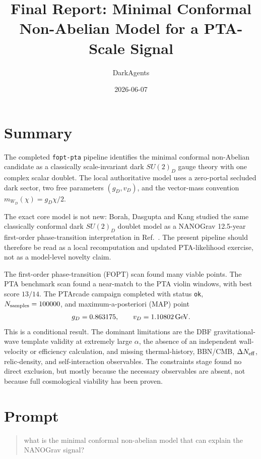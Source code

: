 \documentclass[11pt]{article}
\title{Final Report: Minimal Conformal Non-Abelian Model for a PTA-Scale Signal}
\author{DarkAgents}
\date{2026-06-07}
\newcommand{\SUtwoD}{\ensuremath{SU(2)_D}}
\newcommand{\gev}{\,{\rm GeV}}
\begin{document}
\maketitle

\section{Summary}
The completed \texttt{fopt-pta} pipeline identifies the minimal conformal non-Abelian candidate as a classically scale-invariant dark \SUtwoD{} gauge theory with one complex scalar doublet. The local authoritative model uses a zero-portal secluded dark sector, two free parameters $(g_D,v_D)$, and the vector-mass convention $m_{W_D}(\chi)=g_D\chi/2$.

The exact core model is not new: Borah, Dasgupta and Kang studied the same classically conformal dark \SUtwoD{} doublet model as a NANOGrav 12.5-year first-order phase-transition interpretation in Ref.~\cite{Borah2021}. The present pipeline should therefore be read as a local recomputation and updated PTA-likelihood exercise, not as a model-level novelty claim.

The first-order phase-transition (FOPT) scan found many viable points. The PTA benchmark scan found a near-match to the PTA violin windows, with best score $13/14$. The PTArcade campaign completed with status \texttt{ok}, $N_{\rm samples}=100000$, and maximum-a-posteriori (MAP) point
\[
g_D=0.863175,\qquad v_D=1.10802\gev .
\]
This is a conditional result. The dominant limitations are the DBF gravitational-wave template validity at extremely large $\alpha$, the absence of an independent wall-velocity or efficiency calculation, and missing thermal-history, BBN/CMB, $\Delta N_{\rm eff}$, relic-density, and self-interaction observables. The constraints stage found no direct exclusion, but mostly because the necessary observables are absent, not because full cosmological viability has been proven.

\section{Prompt}
\begin{quote}
what is the minimal conformal non-abelian model that can explain the NANOGrav                     
  signal?
\end{quote}
\end{document}
